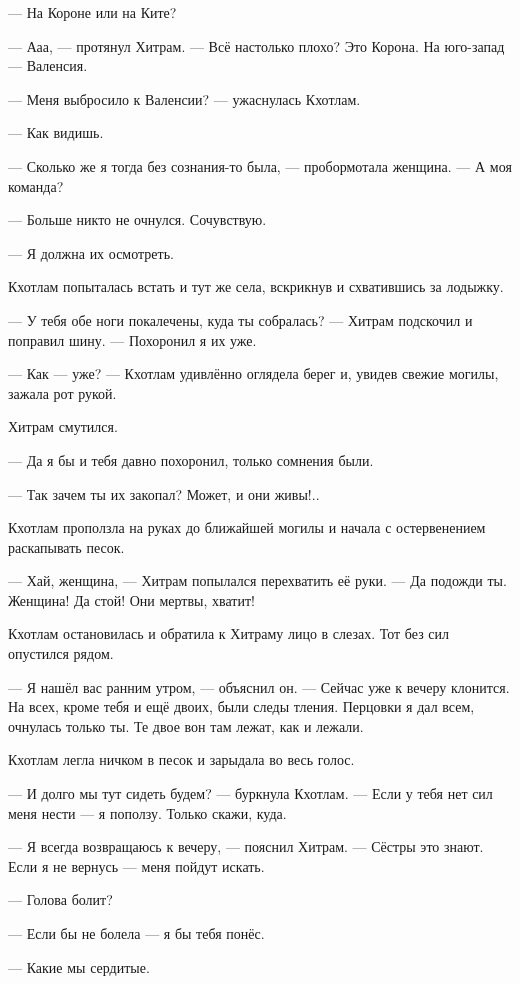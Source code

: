 \documentclass[a4paper,10pt,fleqn]{book}\usepackage{cooltooltips}\usepackage{polyglossia}\setdefaultlanguage{english}\setotherlanguage{russian}\defaultfontfeatures{Ligatures=TeX,Mapping=tex-text} \usepackage{xcolor}\definecolor{lightgray}{HTML}{bbbbbb}\color{lightgray}\newcommand{\ml}[3]{\textcolor{black}{#3}}
\newcommand{\asterism}{\vspace{1em}{\centering\Large\bfseries$\ast~\ast~\ast$\par}\vspace{1em}}
\begin{document}
--- На Короне или на Ките?

--- Ааа, --- протянул Хитрам.
--- Всё настолько плохо?
Это Корона.
На юго-запад --- Валенсия.

--- Меня выбросило к Валенсии? --- ужаснулась Кхотлам.

--- Как видишь.

--- Сколько же я тогда без сознания-то была, --- пробормотала женщина.
--- А моя команда?

--- Больше никто не очнулся.
Сочувствую.

--- Я должна их осмотреть.

Кхотлам попыталась встать и тут же села, вскрикнув и схватившись за лодыжку.

--- У тебя обе ноги покалечены, куда ты собралась? --- Хитрам подскочил и поправил шину.
--- Похоронил я их уже.

--- Как --- уже? --- Кхотлам удивлённо оглядела берег и, увидев свежие могилы, зажала рот рукой.

Хитрам смутился.

--- Да я бы и тебя давно похоронил, только сомнения были.

--- Так зачем ты их закопал?
Может, и они живы!..

Кхотлам проползла на руках до ближайшей могилы и начала с остервенением раскапывать песок.

--- Хай, женщина, --- Хитрам попылался перехватить её руки.
--- Да подожди ты.
Женщина!
Да стой!
Они мертвы, хватит!

Кхотлам остановилась и обратила к Хитраму лицо в слезах.
Тот без сил опустился рядом.

--- Я нашёл вас ранним утром, --- объяснил он.
--- Сейчас уже к вечеру клонится.
На всех, кроме тебя и ещё двоих, были следы тления.
Перцовки я дал всем, очнулась только ты.
Те двое вон там лежат, как и лежали.

Кхотлам легла ничком в песок и зарыдала во весь голос.

\asterism

--- И долго мы тут сидеть будем? --- буркнула Кхотлам.
--- Если у тебя нет сил меня нести --- я поползу.
Только скажи, куда.

--- Я всегда возвращаюсь к вечеру, --- пояснил Хитрам.
--- Сёстры это знают.
Если я не вернусь --- меня пойдут искать.

--- Голова болит?

--- Если бы не болела --- я бы тебя понёс.

--- Какие мы сердитые.
\end{document}
